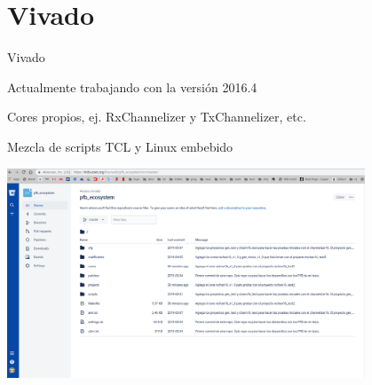 \documentclass[ignorenonframetext,12pt]{beamer}
\begin{document}
\section{Vivado}
\begin{frame}{Vivado}

				Actualmente trabajando con la versi\'on 2016.4

				Cores propios, ej. RxChannelizer y TxChannelizer, etc.

				Mezcla de scripts TCL y Linux embebido
				\begin{center}
								\includegraphics[width=0.8\textwidth]{pfb_repo}
				\end{center}
\end{frame}
\end{document}
